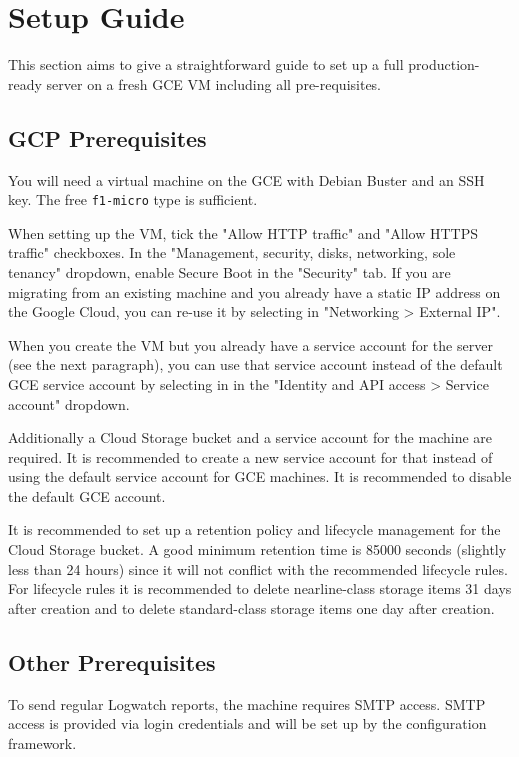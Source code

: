 \documentclass[12pt,a4paper]{report}
\begin{document}
	\section{Setup Guide}
	This section aims to give a straightforward guide to set up a full production-ready server on a fresh GCE VM including all pre-requisites.

	\subsection{GCP Prerequisites}
	You will need a virtual machine on the GCE with Debian Buster and an SSH key. The free \lstinline|f1-micro| type is sufficient.

	When setting up the VM, tick the "Allow HTTP traffic" and "Allow HTTPS traffic" checkboxes. In the "Management, security, disks, networking, sole tenancy" dropdown, enable Secure Boot in the "Security" tab. If you are migrating from an existing machine and you already have a static IP address on the Google Cloud, you can re-use it by selecting in "Networking > External IP".

	When you create the VM but you already have a service account for the server (see the next paragraph), you can use that service account instead of the default GCE service account by selecting in in the "Identity and API access > Service account" dropdown.

	Additionally a Cloud Storage bucket and a service account for the machine are required. It is recommended to create a new service account for that instead of using the default service account for GCE machines. It is recommended to disable the default GCE account.

	It is recommended to set up a retention policy and lifecycle management for the Cloud Storage bucket. A good minimum retention time is 85000 seconds (slightly less than 24 hours) since it will not conflict with the recommended lifecycle rules. For lifecycle rules it is recommended to delete nearline-class storage items 31 days after creation and to delete standard-class storage items one day after creation.

	\subsection{Other Prerequisites}
	To send regular Logwatch reports, the machine requires SMTP access. SMTP access is provided via login credentials and will be set up by the configuration framework.
\end{document}
